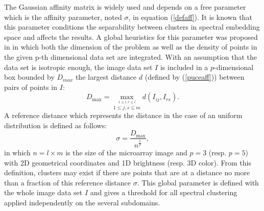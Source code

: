 \documentclass[]{svmult}
\begin{document}
The Gaussian affinity matrix is widely used and depends on a free parameter
which is the affinity parameter, noted $\sigma$, in equation (\ref{defaff}). It
is known that this parameter conditions the separability between clusters in spectral embedding space and affects the results. 
A global heuristics for this parameter was proposed in
\cite{vec08b} in which both the dimension of the problem as well as the
density of points in the given p-th dimensional data set are  integrated. With
an assumption that the 
data set is isotropic enough, the image
data set $I$ is included in a $p$-dimensional box bounded by $D_{max}$ the
largest distance $d$ (defined by (\ref{puceaff})) between pairs of points in
$I$:
$$\displaystyle 
D_{\max} = \max_{ \stackrel{1\leq i,r \leq l}{1\leq j,s \leq m} }
d(I_{ij},I_{rs}).$$
A reference distance 
which represents the distance in
the case of an uniform distribution is defined as follows:
\begin{equation}
 \sigma = \frac{D_{\max}}{n^{\frac{1}{p}}}, \label{sigma}
\end{equation}
in which $n=l\times m$ is the size of the microarray image and  $p=3$ (resp.
$p=5$) with 2D geometrical coordinates and 1D brightness (resp. 3D color).
From this definition, clusters may exist if there are points that are at a
distance no more than a fraction of this reference distance $\sigma$.
This global parameter is defined with the whole image data set $I$ and gives a
threshold for all spectral clustering applied independently on the several
subdomains.

\vspace{-0.7cm}
\end{document}
